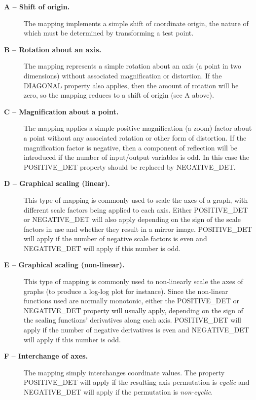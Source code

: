 \documentclass[twoside,11pt]{article}
\newcommand{\name}[1]{\mbox{\small{#1}}}
\begin{document}
\begin{description}

\item[\textbf{A -- Shift of origin.}] The mapping implements a simple shift of
coordinate origin, the nature of which must be determined by transforming a
test point. 

\item[\textbf{B -- Rotation about an axis.}] The mapping represents a
simple rotation about an axis (a point in two dimensions) without
associated magnification or distortion.
If the \name{DIAGONAL} property also applies, then the amount of rotation
will be zero, so the mapping reduces to a shift of origin (see A above). 

\item[\textbf{C -- Magnification about a point.}] The mapping applies a
simple positive magnification (a zoom) factor about a point without any
associated rotation or other form of distortion. 
If the magnification factor is negative, then a component of reflection will
be introduced if the number of input/output variables is odd.
In this case the \name{POSITIVE\_DET} property should be replaced by 
\name{NEGATIVE\_DET}.

\item[\textbf{D -- Graphical scaling (linear).}] This type of mapping is
commonly used to scale the axes of a graph, with different scale factors
being applied to each axis. 
Either \name{POSITIVE\_DET} or \name{NEGATIVE\_DET} will also apply depending
on the sign of the scale factors in use and whether they result in a mirror
image. 
\name{POSITIVE\_DET} will apply if the number of negative scale factors is
even and \name{NEGATIVE\_DET} will apply if this number is odd. 

\item[\textbf{E -- Graphical scaling (non-linear).}] This type of mapping is
commonly used to non-linearly scale the axes of graphs (to produce a
log-log plot for instance).
Since the non-linear functions used are normally monotonic, either the
\name{POSITIVE\_DET} or \name{NEGATIVE\_DET} property will usually apply,
depending on the sign of the scaling functions' derivatives along each axis.
\name{POSITIVE\_DET} will apply if the number of negative derivatives is
even and \name{NEGATIVE\_DET} will apply if this number is odd. 

\item[\textbf{F -- Interchange of axes.}] The mapping simply interchanges
coordinate values. 
The property \name{POSITIVE\_DET} will apply if the resulting axis
permutation is \emph{cyclic} and \name{NEGATIVE\_DET} will apply if the
permutation is \emph{non-cyclic}. 


\end{description}
\end{document}
